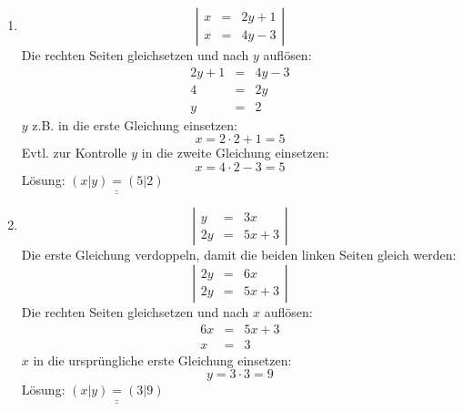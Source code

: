 \documentclass[%
11pt,%
twoside,%
titlepage,%
german,%
]{scrartcl}
\newcommand{\result}[1]{\underline{\underline{#1}}}
\begin{document}
\begin{enumerate}
\begin{enumerate}
  \item 
    \begin{displaymath}
      \left| 
        \begin{array}{rcl}
          x & = & 2y+1 \\
          x & = & 4y-3
        \end{array} \right|
    \end{displaymath}
    Die rechten Seiten gleichsetzen und nach $y$ aufl\"osen:
    \begin{eqnarray*}
      2y+1 & = & 4y-3 \\
      4 & = & 2y \\
      y & = & 2
    \end{eqnarray*}
    $y$ z.B. in die erste Gleichung einsetzen:
    \begin{displaymath}
      x = 2 \cdot 2+1 = 5
    \end{displaymath}
    Evtl. zur Kontrolle $y$ in die zweite Gleichung einsetzen:
    \begin{displaymath}
      x = 4 \cdot 2 -3 = 5
    \end{displaymath}
    L\"osung: $\result{(x|y)=(5|2)}$

  \item 
    \begin{displaymath}
      \left| 
        \begin{array}{rcl}
          y & = & 3x \\
          2y & = & 5x+3
        \end{array} \right|
    \end{displaymath}
    Die erste Gleichung verdoppeln, damit die beiden linken Seiten gleich werden:
    \begin{displaymath}
      \left| 
        \begin{array}{rcl}
          2y & = & 6x \\
          2y & = & 5x+3
        \end{array} \right|
    \end{displaymath}  
    Die rechten Seiten gleichsetzen und nach $x$ aufl\"osen:
    \begin{eqnarray*}
      6x & = & 5x+3 \\
      x & = & 3
    \end{eqnarray*}
    $x$ in die urspr\"ungliche erste Gleichung einsetzen:
    \begin{displaymath}
      y = 3 \cdot 3 = 9
    \end{displaymath}
    L\"osung: $\result{(x|y)=(3|9)}$


\end{enumerate}
\end{enumerate}
\end{document}
